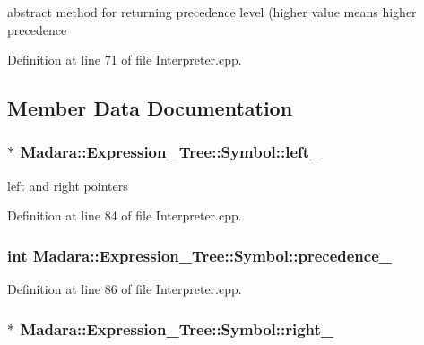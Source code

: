 abstract method for returning precedence level (higher value means higher precedence 



Definition at line 71 of file Interpreter.cpp.



\subsection{Member Data Documentation}
\hypertarget{classMadara_1_1Expression__Tree_1_1Symbol_a7808eb3daad675e2e01409f173a41cee}{
\subsubsection[{left\_\-}]{$\ast$ {\bf Madara::Expression\_\-Tree::Symbol::left\_\-}}}
\label{d5/d85/classMadara_1_1Expression__Tree_1_1Symbol_a7808eb3daad675e2e01409f173a41cee}


left and right pointers 



Definition at line 84 of file Interpreter.cpp.

\hypertarget{classMadara_1_1Expression__Tree_1_1Symbol_a2de31139261eea47dccd48d377780803}{
\subsubsection[{precedence\_\-}]{\setlength{\rightskip}{0pt plus 5cm}int {\bf Madara::Expression\_\-Tree::Symbol::precedence\_\-}}}
\label{d5/d85/classMadara_1_1Expression__Tree_1_1Symbol_a2de31139261eea47dccd48d377780803}


Definition at line 86 of file Interpreter.cpp.

\hypertarget{classMadara_1_1Expression__Tree_1_1Symbol_a13467d1c78fbf06c3d64a6a4770eee7a}{
\subsubsection[{right\_\-}]{$\ast$ {\bf Madara::Expression\_\-Tree::Symbol::right\_\-}}}
\label{d5/d85/classMadara_1_1Expression__Tree_1_1Symbol_a13467d1c78fbf06c3d64a6a4770eee7a}


